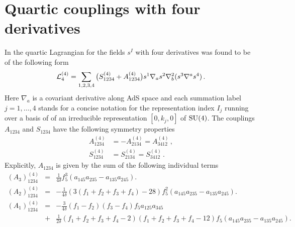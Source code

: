 \documentclass[12pt,a4paper]{article}
\def\de{\delta }
\numberwithin{equation}{section}
\newcommand{\bea}{\begin{eqnarray}}
\newcommand{\eea}{\end{eqnarray}}
\begin{document}
\section{Quartic couplings with four derivatives}
In \cite{Arutyunov:1999fb} the quartic Lagrangian for the fields $s^I$ with four derivatives was found to be of the following form
\bea
\label{Lag}
{\cal L}_4^{(4)}=\sum_{1,2,3,4}\big(S_{1234}^{(4)}+A_{1234}^{(4)}\big)s^{1}\nabla_a s^{2}\nabla_b^2(s^{3}\nabla^a s^{4})\, .
\eea
Here $\nabla_a$  is a covariant derivative along AdS space and each summation label $j=1,\ldots, 4$ stands for a concise notation for the representation index $I_j$ running over a basis of of an irreducible representation $[0,k_j,0]$ of ${\rm SU(4)}$. 
The couplings $A_{1234}$ and $S_{1234}$ have the following symmetry properties
\begin{equation}
\label{AS}
\begin{aligned}
A_{1234}^{(4)}&=-A_{2134}^{(4)}=A_{3412}^{(4)}\, , \\
S_{1234}^{(4)}&=S_{2134}^{(4)}=S_{3412}^{(4)}\, .
\end{aligned}
\end{equation}
Explicitly, $A_{1234}$ is given by the sum of the following individual terms
\bea
(A_3)^{(4)}_{1234}&=&\frac{1}{4\de}
f_5^3\left( a_{145}a_{235}-a_{135}a_{245}\right) .\nonumber\\
(A_2)^{(4)}_{1234}&=&-\frac{1}{4\de}(3(f_1+f_2+f_3+f_4)-28)
f_5^2\left( a_{145}a_{235}-a_{135}a_{245}\right) .\nonumber\\
(A_1)^{(4)}_{1234}&=&-\frac{3}{4\de}(f_1-f_2)(f_3-f_4)
f_5 a_{125}a_{345} \nonumber\\
&+&\frac{1}{2\de}(f_1+f_2+f_3+f_4-2)(f_1+f_2+f_3+f_4-12)
f_5\left( a_{145}a_{235}-a_{135}a_{245}\right) .\nonumber
\eea
\end{document}
